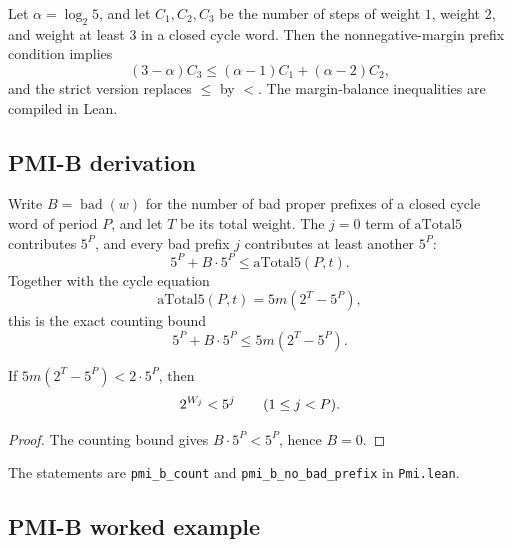 \begin{lemma}\label{lem:margin-balance}
Let $\alpha=\log_2 5$, and let $C_1,C_2,C_3$ be the number of steps of
weight $1$, weight $2$, and weight at least $3$ in a closed cycle word.
Then the nonnegative-margin prefix condition implies
\begin{equation*}
  (3-\alpha)C_3\le(\alpha-1)C_1+(\alpha-2)C_2,
\end{equation*}
and the strict version replaces $\le$ by $<$.  The margin-balance
inequalities are compiled in Lean.
\end{lemma}

\subsection{PMI-B derivation}

Write $B=\operatorname{bad}(w)$ for the number of bad proper prefixes
of a closed cycle word of period $P$, and let $T$ be its total weight.
The $j=0$ term of $\mathrm{aTotal5}$ contributes $5^P$, and every bad
prefix $j$ contributes at least another $5^P$:
\begin{equation*}
  5^P+B\cdot5^P\le\mathrm{aTotal5}(P,t).
\end{equation*}
Together with the cycle equation
\begin{equation*}
  \mathrm{aTotal5}(P,t)=5m(2^T-5^P),
\end{equation*}
this is the exact counting bound
\begin{equation*}
  5^P+B\cdot5^P\le5m(2^T-5^P).
\end{equation*}

\begin{corollary}\label{cor:pmi-b-no-bad}
If $5m(2^T-5^P)<2\cdot5^P$, then
\begin{equation*}
  2^{W_j}<5^j\qquad(1\le j<P).
\end{equation*}
\end{corollary}

\begin{proof}
The counting bound gives $B\cdot5^P<5^P$, hence $B=0$.
\end{proof}

The statements are \texttt{pmi\_b\_count} and
\texttt{pmi\_b\_no\_bad\_prefix} in \texttt{Pmi.lean}.

\subsection{PMI-B worked example}

